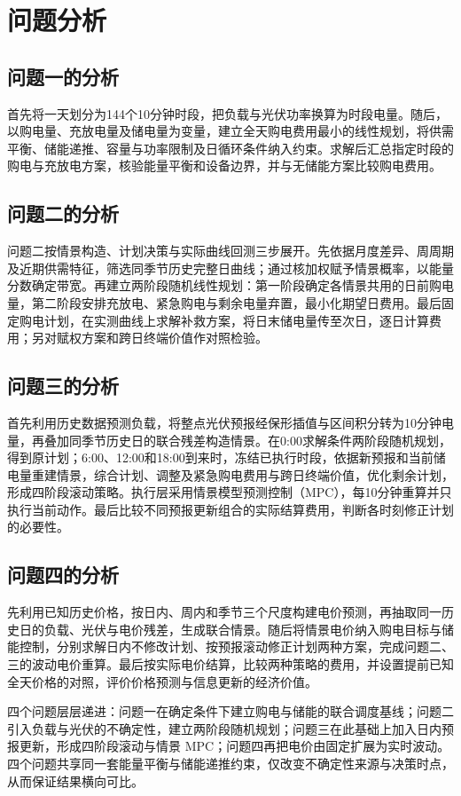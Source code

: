 \section{问题分析}
\label{sec:frontmatter-analysis}

\subsection{问题一的分析}

首先将一天划分为144个10分钟时段，把负载与光伏功率换算为时段电量。随后，以购电量、充放电量及储电量为变量，建立全天购电费用最小的线性规划，将供需平衡、储能递推、容量与功率限制及日循环条件纳入约束。求解后汇总指定时段的购电与充放电方案，核验能量平衡和设备边界，并与无储能方案比较购电费用。

\subsection{问题二的分析}

问题二按情景构造、计划决策与实际曲线回测三步展开。先依据月度差异、周周期及近期供需特征，筛选同季节历史完整日曲线；通过核加权赋予情景概率，以能量分数确定带宽。再建立两阶段随机线性规划：第一阶段确定各情景共用的日前购电量，第二阶段安排充放电、紧急购电与剩余电量弃置，最小化期望日费用。最后固定购电计划，在实测曲线上求解补救方案，将日末储电量传至次日，逐日计算费用；另对赋权方案和跨日终端价值作对照检验。

\subsection{问题三的分析}

首先利用历史数据预测负载，将整点光伏预报经保形插值与区间积分转为10分钟电量，再叠加同季节历史日的联合残差构造情景。在0:00求解条件两阶段随机规划，得到原计划；6:00、12:00和18:00到来时，冻结已执行时段，依据新预报和当前储电量重建情景，综合计划、调整及紧急购电费用与跨日终端价值，优化剩余计划，形成四阶段滚动策略。执行层采用情景模型预测控制（MPC），每10分钟重算并只执行当前动作。最后比较不同预报更新组合的实际结算费用，判断各时刻修正计划的必要性。

\subsection{问题四的分析}

先利用已知历史价格，按日内、周内和季节三个尺度构建电价预测，再抽取同一历史日的负载、光伏与电价残差，生成联合情景。随后将情景电价纳入购电目标与储能控制，分别求解日内不修改计划、按预报滚动修正计划两种方案，完成问题二、三的波动电价重算。最后按实际电价结算，比较两种策略的费用，并设置提前已知全天价格的对照，评价价格预测与信息更新的经济价值。

四个问题层层递进：问题一在确定条件下建立购电与储能的联合调度基线；问题二引入负载与光伏的不确定性，建立两阶段随机规划；问题三在此基础上加入日内预报更新，形成四阶段滚动与情景 MPC；问题四再把电价由固定扩展为实时波动。四个问题共享同一套能量平衡与储能递推约束，仅改变不确定性来源与决策时点，从而保证结果横向可比。
